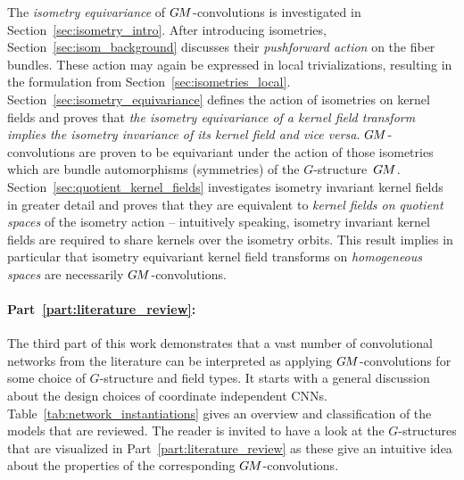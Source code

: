 The \emph{isometry equivariance} of $G\mkern-1.4muM$-convolutions is investigated in Section~\ref{sec:isometry_intro}.
After introducing isometries, Section~\ref{sec:isom_background} discusses their \emph{pushforward action} on the fiber bundles.
These action may again be expressed in local trivializations, resulting in the formulation from Section~\ref{sec:isometries_local}.
Section~\ref{sec:isometry_equivariance} defines the action of isometries on kernel fields and proves that \emph{the isometry equivariance of a kernel field transform implies the isometry invariance of its kernel field and vice versa}.
$G\mkern-1.4muM$-convolutions are proven to be equivariant under the action of those isometries which are bundle automorphisms (symmetries) of the $G$-structure~$G\mkern-1.4muM$.
Section~\ref{sec:quotient_kernel_fields} investigates isometry invariant kernel fields in greater detail and proves that they are equivalent to \emph{kernel fields on quotient spaces} of the isometry action
-- intuitively speaking, isometry invariant kernel fields are required to share kernels over the isometry orbits.
This result implies in particular that isometry equivariant kernel field transforms on \emph{homogeneous spaces} are necessarily $G\mkern-1.4muM$-convolutions.




\paragraph{Part~\ref{part:literature_review}:}

The third part of this work demonstrates that a vast number of convolutional networks from the literature can be interpreted as applying $G\mkern-1.4muM$-convolutions for some choice of $G$-structure and field types.
It starts with a general discussion about the design choices of coordinate independent CNNs.
Table~\ref{tab:network_instantiations} gives an overview and classification of the models that are reviewed.
The reader is invited to have a look at the $G$-structures that are visualized in Part~\ref{part:literature_review} as these give an intuitive idea about the properties of the corresponding $G\mkern-1.4muM$-convolutions.

